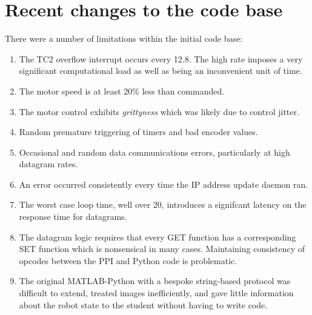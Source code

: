 \documentclass[11pt,fleqn]{article}
\begin{document}
\UndefineShortVerb{\+}


\section{Recent changes to the code base}

There were a number of limitations within the initial code base:
\begin{enumerate}
\item The TC2 overflow interrupt occurs every 12.8\us.  The high rate imposes a very significant computational load as well as being
an inconvenient unit of time.

\item The motor speed is at least 20\% less than commanded.  

\item The motor control exhibits  \textit{grittyness} which was likely due to control jitter.  

\item Random premature triggering of timers and bad encoder values.

\item Occasional and random data communications errors, particularly at high datagram rates.  

\item An error  occurred consistently every time the IP address update daemon ran.

\item The worst case loop time, well over 20\ms, introduces a signifcant latency on the response time for datagrams.  

\item The datagram logic requires that every GET function has a corresponding SET function which is nonsensical in many cases.
Maintaining consistency of opcodes between the PPI and Python code is problematic.


\item The original MATLAB-Python with a bespoke string-based protocol was difficult to extend, treated images inefficiently, and gave little information about the robot state to the student without having to write code.

\end{enumerate}
\end{document}
